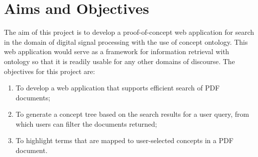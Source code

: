 \section{Aims and Objectives}
The aim of this project is to develop a proof-of-concept web application for search in the domain of digital signal processing with the use of concept ontology. This web application would serve as a framework for information retrieval with ontology so that it is readily usable for any other domains of discourse. The objectives for this project are:

\begin{enumerate}
\item To develop a web application that supports efficient search of PDF documents;
\item To generate a concept tree based on the search results for a user query, from which users can filter the documents returned;
\item To highlight terms that are mapped to user-selected concepts in a PDF document.
\end{enumerate}